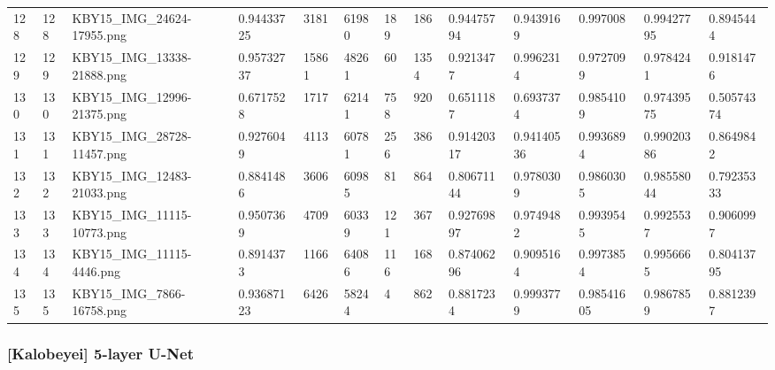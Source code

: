 \documentclass[11pt, a4paper, twoside]{report}
\begin{document}
\begin{longtable}[c]{@{}lllllllllllll@{}}
128 & 128 & KBY15\_IMG\_24624-17955.png & 0.94433725 & 3181 & 61980 & 189 & 186 & 0.94475794 & 0.9439169 & 0.997008 & 0.99427795 & 0.8945444 \\
129 & 129 & KBY15\_IMG\_13338-21888.png & 0.95732737 & 15861 & 48261 & 60 & 1354 & 0.9213477 & 0.9962314 & 0.9727099 & 0.9784241 & 0.9181476 \\
130 & 130 & KBY15\_IMG\_12996-21375.png & 0.6717528 & 1717 & 62141 & 758 & 920 & 0.6511187 & 0.6937374 & 0.9854109 & 0.97439575 & 0.50574374 \\
131 & 131 & KBY15\_IMG\_28728-11457.png & 0.9276049 & 4113 & 60781 & 256 & 386 & 0.91420317 & 0.94140536 & 0.9936894 & 0.99020386 & 0.8649842 \\
132 & 132 & KBY15\_IMG\_12483-21033.png & 0.8841486 & 3606 & 60985 & 81 & 864 & 0.80671144 & 0.9780309 & 0.9860305 & 0.98558044 & 0.79235333 \\
133 & 133 & KBY15\_IMG\_11115-10773.png & 0.9507369 & 4709 & 60339 & 121 & 367 & 0.92769897 & 0.9749482 & 0.9939545 & 0.9925537 & 0.9060997 \\
134 & 134 & KBY15\_IMG\_11115-4446.png & 0.8914373 & 1166 & 64086 & 116 & 168 & 0.87406296 & 0.9095164 & 0.9973854 & 0.9956665 & 0.80413795 \\
135 & 135 & KBY15\_IMG\_7866-16758.png & 0.93687123 & 6426 & 58244 & 4 & 862 & 0.8817234 & 0.9993779 & 0.98541605 & 0.9867859 & 0.8812397 \\* \bottomrule
\end{longtable}

\newpage

\subsubsection{[Kalobeyei] 5-layer U-Net}
\end{document}

